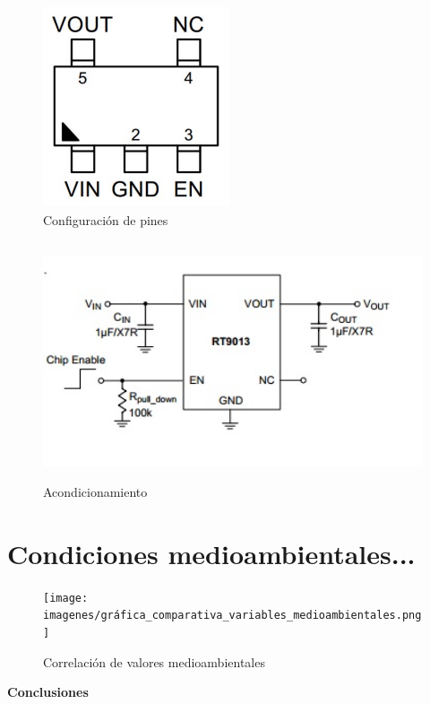 \begin{figure}[H]
    \centering
    \includegraphics[width=5.5cm, height=6cm]{imagenes/esquematico RT9013.pdf}
    \caption{Configuración de pines}
    \label{imag:pines_RT9013}
\end{figure}

\begin{figure}[H]
    \centering
    \includegraphics[width=12cm, height=7cm]{imagenes/acondicionamiento RT9013.jpg}
    \caption{Acondicionamiento}
    \label{imag:acondicionamiento_RT9013}
\end{figure}

\newpage

\section{Condiciones medioambientales...} \label{sec: condiciones_medioambientales}


    \begin{figure}[H]
        \centering
        \texttt{[image: imagenes/gráfica\_comparativa\_variables\_medioambientales.png]}
        \caption{Correlación de valores medioambientales}
        \label{imag:grafica_condiciones_medioambientales}
    \end{figure}


        \textbf{\Large Conclusiones}\newline
